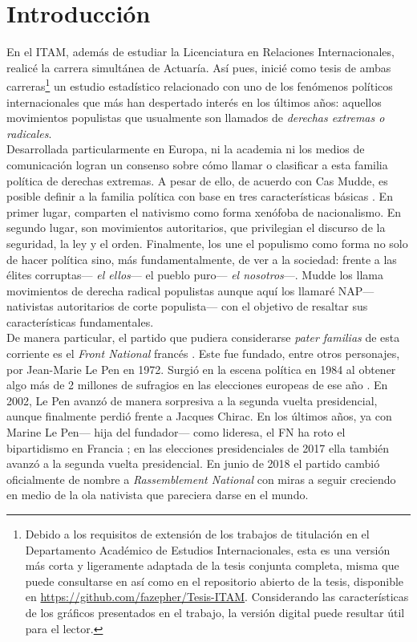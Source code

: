 \chapter*{Introducción}

En el ITAM, además de estudiar la Licenciatura en Relaciones Internacionales, realicé la carrera simultánea de Actuaría. Así pues, inicié como tesis de ambas carreras\footnote{Debido a los requisitos de extensión de los trabajos de titulación en el Departamento Académico de Estudios Internacionales, esta es una versión más corta y ligeramente adaptada de la tesis conjunta completa, misma que puede consultarse en \textcite{TesisAct} así como en el repositorio abierto de la tesis, disponible en \url{https://github.com/fazepher/Tesis-ITAM}. Considerando las características de los gráficos presentados en el trabajo, la versión digital puede resultar útil para el lector.} un estudio estadístico relacionado con uno de los fenómenos políticos internacionales que más han despertado interés en los últimos años: aquellos movimientos populistas que usualmente son llamados de \textit{derechas extremas o radicales}.\\  

Desarrollada particularmente en Europa, ni la academia ni los medios de comunicación logran un consenso sobre cómo llamar o clasificar a esta familia política de derechas extremas. A pesar de ello, de acuerdo con Cas Mudde, es posible definir a la familia política con base en tres características básicas \parencites{Mudde07a}{Beauchamp16a}. En primer lugar, comparten el nativismo como forma xenófoba de nacionalismo. En segundo lugar, son movimientos autoritarios, que privilegian el discurso de la seguridad, la ley y el orden. Finalmente, los une el populismo como forma no solo de hacer política sino, más fundamentalmente, de ver a la sociedad: frente a las élites corruptas--- \textit{el ellos}--- el pueblo puro--- \textit{el nosotros}---. Mudde los llama movimientos de derecha radical populistas aunque aquí los llamaré NAP--- nativistas autoritarios de corte populista--- con el objetivo de resaltar sus características fundamentales.\\

De manera particular, el partido que pudiera considerarse \textit{pater familias} de esta corriente es el \textit{Front National} francés \parencite{Mudde07a}. Este fue fundado, entre otros personajes, por Jean-Marie Le Pen en 1972. Surgió en la escena política en 1984 al obtener algo más de 2 millones de sufragios en las elecciones europeas de ese año \parencite{LeBras15}. En 2002, Le Pen avanzó de manera sorpresiva a la segunda vuelta presidencial, aunque finalmente perdió frente a Jacques Chirac. En los últimos años, ya con Marine Le Pen--- hija del fundador--- como lideresa, el FN ha roto el bipartidismo en Francia \parencite{LeBras16};  en las elecciones presidenciales de 2017 ella también avanzó a la segunda vuelta presidencial. En junio de 2018 el partido cambió oficialmente de nombre a \textit{Rassemblement National} con miras a seguir creciendo en medio de la ola nativista que pareciera darse en el mundo.\\

